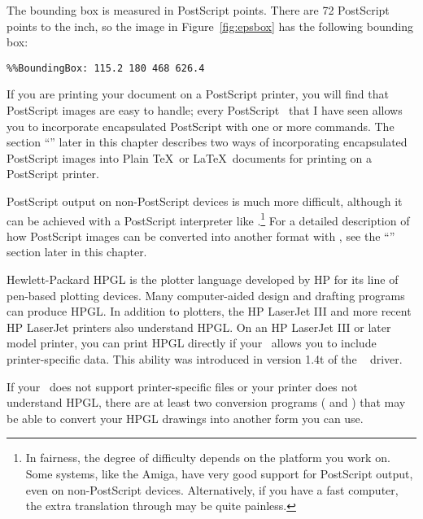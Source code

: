 
The bounding box is measured in PostScript points.  There are 72 PostScript
points to the inch, so the image in Figure~\ref{fig:epsbox} has the
following bounding box:

\begin{exindent}
  \verb|%%BoundingBox: 115.2 180 468 626.4|
\end{exindent}

If you are printing your document on a PostScript printer, you will find that
PostScript
images are easy to handle; every PostScript \dvidriver\ that I have seen 
allows you to incorporate encapsulated PostScript
with one or more  commands.  The section 
``''
later in this chapter describes two ways of incorporating encapsulated
PostScript images into Plain \TeX\ or \LaTeX\ documents for printing
on a PostScript printer.

PostScript output on non-PostScript devices is much more difficult,
although it can be achieved with a PostScript interpreter like
.\footnote{In fairness, the degree of difficulty
depends on the platform you work on.  Some systems, like the Amiga,
have very good support for PostScript output, even on non-PostScript
devices.  Alternatively, if you have a fast computer, the extra 
translation through  may be quite painless.}
For a detailed description of how PostScript images can be converted
into another format with , see the ``''
section later in this chapter.

Hewlett-Packard HPGL is 
the plotter language developed by
HP for its line of pen-based plotting devices.  Many
computer-aided design and drafting programs can produce HPGL.  In
addition to plotters, the HP LaserJet III and more recent HP
LaserJet printers also understand HPGL.  On an
HP LaserJet III or later model printer, you can print HPGL directly if
your \dvidriver\ allows you to include printer-specific data.  This
ability was introduced in version 1.4t 
of the \emTeX\ 
driver.

If your \dvidriver\ does not support printer-specific files or
your printer does not understand HPGL, there are at least two
conversion programs ( and 
) that 
may be able to convert your HPGL drawings into another form you can use.

